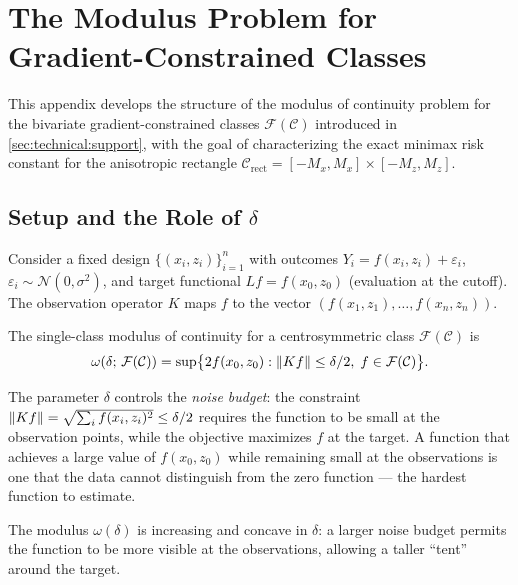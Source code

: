 \section{The Modulus Problem for Gradient-Constrained Classes}\label{app:modulus}

This appendix develops the structure of the modulus of continuity problem for the bivariate gradient-constrained classes $\mathcal{F}(\mathcal{C})$ introduced in \cref{sec:technical:support}, with the goal of characterizing the exact minimax risk constant for the anisotropic rectangle $\mathcal{C}_{\mathrm{rect}} = [-M_x, M_x] \times [-M_z, M_z]$.


\subsection{Setup and the Role of $\delta$}\label{app:modulus:setup}

Consider a fixed design $\{(x_i, z_i)\}_{i=1}^n$ with outcomes $Y_i = f(x_i, z_i) + \varepsilon_i$, $\varepsilon_i \sim \mathcal{N}(0, \sigma^2)$, and target functional $Lf = f(x_0, z_0)$ (evaluation at the cutoff).
The observation operator $K$ maps $f$ to the vector $(f(x_1, z_1), \ldots, f(x_n, z_n))$.

The single-class modulus of continuity for a centrosymmetric class $\mathcal{F}(\mathcal{C})$ is
\begin{equation}\label{eq:app_modulus}
	\omega(\delta;\, \mathcal{F}(\mathcal{C})) = \sup\bigl\{ 2f(x_0, z_0) : \lVert Kf\rVert \leq \delta/2,\; f \in \mathcal{F}(\mathcal{C}) \bigr\}.
\end{equation}

The parameter $\delta$ controls the \emph{noise budget}: the constraint $\lVert Kf\rVert = \sqrt{\sum_i f(x_i, z_i)^2} \leq \delta/2$ requires the function to be small at the observation points, while the objective maximizes $f$ at the target.
A function that achieves a large value of $f(x_0, z_0)$ while remaining small at the observations is one that the data cannot distinguish from the zero function --- the hardest function to estimate.

The modulus $\omega(\delta)$ is increasing and concave in $\delta$: a larger noise budget permits the function to be more visible at the observations, allowing a taller ``tent'' around the target.


